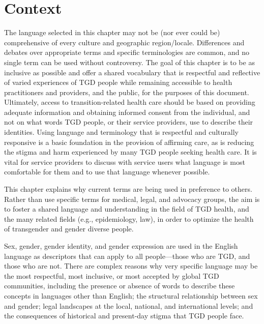 \documentclass[
]{book}
\begin{document}
\hypertarget{context}{%
\section*{Context}\label{context}}

The language selected in this chapter may not
be (nor ever could be) comprehensive of every
culture and geographic region/locale. Differences
and debates over appropriate terms and specific
terminologies are common, and no single term
can be used without controversy. The goal of this
chapter is to be as inclusive as possible and offer
a shared vocabulary that is respectful and reflective of varied experiences of TGD people while
remaining accessible to health practitioners and
providers, and the public, for the purposes of
this document. Ultimately, access to
transition-related health care should be based on
providing adequate information and obtaining
informed consent from the individual, and not
on what words TGD people, or their service providers, use to describe their identities. Using language and terminology that is respectful and
culturally responsive is a basic foundation in the
provision of affirming care, as is reducing the
stigma and harm experienced by many TGD people seeking health care. It is vital for service providers to discuss with service users what language
is most comfortable for them and to use that
language whenever possible.

This chapter explains why current terms are
being used in preference to others. Rather than
use specific terms for medical, legal, and advocacy groups, the aim is to foster a shared language and understanding in the field of TGD
health, and the many related fields (e.g., epidemiology, law), in order to optimize the health of
transgender and gender diverse people.

Sex, gender, gender identity, and gender
expression are used in the English language as
descriptors that can apply to all people---those
who are TGD, and those who are not. There are
complex reasons why very specific language may
be the most respectful, most inclusive, or most
accepted by global TGD communities, including
the presence or absence of words to describe
these concepts in languages other than English;
the structural relationship between sex and gender; legal landscapes at the local, national, and
international levels; and the consequences of historical and present-day stigma that TGD people face.
\end{document}

